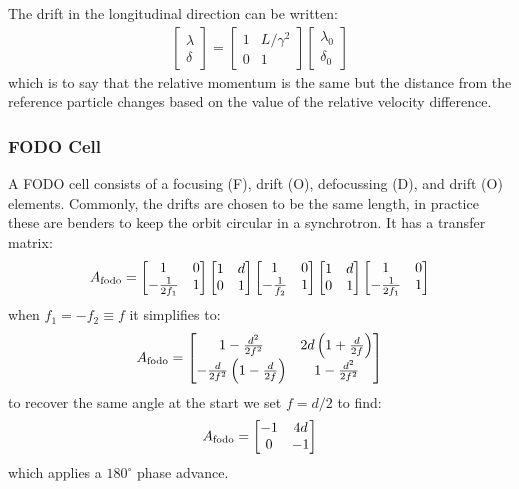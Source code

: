 \documentclass{article}
\numberwithin{equation}{section}
\begin{document}
The drift in the longitudinal direction can be written:
\begin{align}
\begin{bmatrix} \lambda \\ \delta \end{bmatrix} =
\begin{bmatrix} 1 & L/\gamma^2 \\ 0 & 1 \end{bmatrix}\begin{bmatrix} \lambda_0 \\ \delta_0 \end{bmatrix}
\end{align}
which is to say that the relative momentum is the same but the distance from the reference particle changes based on the value of the relative velocity difference.

\subsubsection{FODO Cell}
A FODO cell consists of a focusing (F), drift (O), defocussing (D), and drift (O) elements. Commonly, the drifts are chosen to be the same length, in practice these are benders to keep the orbit circular in a synchrotron. It has a transfer matrix:
\begin{align}
A_{\rm fodo} = 
\begin{bmatrix} 1 & 0 \\ -\frac{1}{2f_1} & 1 \end{bmatrix}
\begin{bmatrix} 1 & d \\ 0 & 1 \end{bmatrix}
\begin{bmatrix} 1 & 0 \\ -\frac{1}{f_2} & 1 \end{bmatrix}
\begin{bmatrix} 1 & d \\ 0 & 1 \end{bmatrix}
\begin{bmatrix} 1 & 0 \\ -\frac{1}{2f_1} & 1 \end{bmatrix}
\end{align}
when $f_1=-f_2 \equiv f$ it simplifies to:
\begin{align}
A_{\rm fodo} = 
\begin{bmatrix} 1-\frac{d^2}{2f^2} & 2d \left( 1 + \frac{d}{2f} \right) \\ 
- \frac{d}{2f^2}\left( 1 - \frac{d}{2f} \right) & 1-\frac{d^2}{2f^2} \end{bmatrix}
\end{align}
to recover the same angle at the start we set $f = d/2$ to find:
\begin{align}
A_{\rm fodo} = 
\begin{bmatrix} -1 & 4d  \\ 0 & -1 \end{bmatrix}
\end{align}
which applies a $180^\circ$ phase advance.
\end{document}
